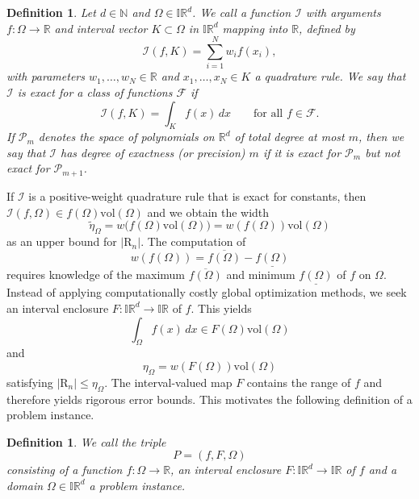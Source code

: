 \documentclass[a4paper, 11pt]{article}
\newtheorem{definition}[theorem]{Definition}
\newcommand{\vol}{\mathrm{vol}}
\begin{document}
	\begin{definition}\label{def: quadrature rule}
		Let $d\in \mathbb{N}$ and $\Omega \in \mathbb{IR}^d$. We call a function $\mathcal{I}$ with arguments $f:\Omega \to \mathbb{R}$ and interval vector $K \subset \Omega$ in $\mathbb{IR}^d$ mapping into $\mathbb{R}$, defined by
		$$ \mathcal{I}(f,K) = \sum_{i=1}^N w_i f(x_i), $$
		with parameters $w_1,\dotsc,w_N \in \mathbb{R}$ and $x_1,\dotsc,x_N \in K$ a quadrature rule.
		We say that $\mathcal{I}$ is exact for a class of functions $\mathcal{F}$ if
		$$ \mathcal{I}(f,K) = \int_K f(x)\,dx \qquad \text{for all } f \in \mathcal{F}. $$
		If $\mathcal{P}_m$ denotes the space of polynomials on $\mathbb{R}^d$ of total degree
		at most $m$, then we say that $\mathcal{I}$ has {degree of exactness} (or {precision}) $m$
		if it is exact for $\mathcal{P}_m$ but not exact for $\mathcal{P}_{m+1}$.
	\end{definition}
	
	If $\mathcal{I}$ is a positive-weight quadrature rule {that} is exact for constants, then $\mathcal{I}(f,\Omega)\in f(\Omega)\vol(\Omega)$ and we obtain the width
	$$\tilde{\eta}_\Omega = w\big(f(\Omega)\vol(\Omega) \big) = w(f(\Omega))\vol(\Omega)$$
	as an upper bound for $|\mathrm{R}_n|$.
	The computation of
	$$ w(f(\Omega)) = \overline{f(\Omega)} - \underline{f(\Omega)} $$
	requires knowledge of the maximum $\overline{f(\Omega)}$ and minimum $\underline{f(\Omega)}$ of $f$ on $\Omega$. Instead of applying computationally costly global optimization methods, we seek an interval enclosure $F: \mathbb{IR}^d \to  \mathbb{IR}$ of $f$. This yields
	$$\int_\Omega f(x)\, dx \in F(\Omega) \vol(\Omega) $$
	and 
	$$\eta_\Omega = w(F(\Omega))\vol(\Omega)$$
	satisfying $|\mathrm{R}_n| \leq \eta_\Omega$.
	The interval-valued map $F$ contains the range of $f$ and therefore yields rigorous error bounds. This motivates the following definition of a problem instance.
	
	\begin{definition}
		We call the triple
		\begin{equation}
			P = (f, F, \Omega)
		\end{equation}
		consisting of a function $f:\Omega \to \mathbb{R}$, an interval enclosure $F:\mathbb{IR}^d \to \mathbb{IR}$ of $f$ and a domain $\Omega\in \mathbb{IR}^d$ a problem instance.
	\end{definition}
	
\end{document}
